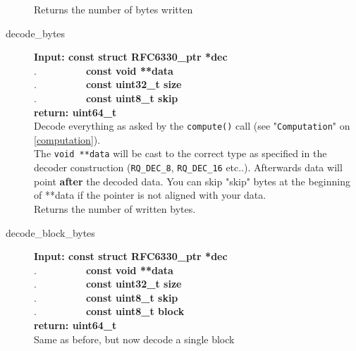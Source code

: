 \documentclass[11pt,a4paper]{refart}
\begin{document}
\begin{description}
Returns the number of bytes written
\item[decode\_bytes]\textbf{Input: const struct RFC6330\_ptr *dec}\\
.\ \ \ \ \ \ \ \ \ \ \textbf{const void **data}\\
.\ \ \ \ \ \ \ \ \ \ \textbf{const uint32\_t size}\\
.\ \ \ \ \ \ \ \ \ \ \textbf{const uint8\_t skip}\\
\textbf{return: uint64\_t}\\
Decode everything as asked by the \texttt{compute()} call (see "\texttt{Computation}" on \ref{computation}).\\
The \texttt{void **data} will be cast to the correct type as specified in the decoder construction (\texttt{RQ\_DEC\_8}, \texttt{RQ\_DEC\_16} etc..). Afterwards data will point \textbf{after} the decoded data. You can skip "skip" bytes at the beginning of **data if the pointer is not aligned with your data.\\
Returns the number of written bytes.
\item[decode\_block\_bytes]\textbf{Input: const struct RFC6330\_ptr *dec}\\
.\ \ \ \ \ \ \ \ \ \ \textbf{const void **data}\\
.\ \ \ \ \ \ \ \ \ \ \textbf{const uint32\_t size}\\
.\ \ \ \ \ \ \ \ \ \ \textbf{const uint8\_t skip}\\
.\ \ \ \ \ \ \ \ \ \ \textbf{const uint8\_t block}\\
\textbf{return: uint64\_t}\\
Same as before, but now decode a single block
\end{description}






\printindex
\end{document}
